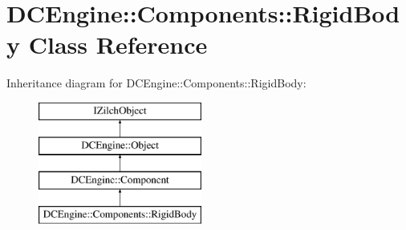 \hypertarget{classDCEngine_1_1Components_1_1RigidBody}{\section{D\-C\-Engine\-:\-:Components\-:\-:Rigid\-Body Class Reference}
\label{classDCEngine_1_1Components_1_1RigidBody}
}
Inheritance diagram for D\-C\-Engine\-:\-:Components\-:\-:Rigid\-Body\-:\begin{figure}[H]
\begin{center}
\leavevmode
\includegraphics[height=4.000000cm]{classDCEngine_1_1Components_1_1RigidBody}
\end{center}
\end{figure}
